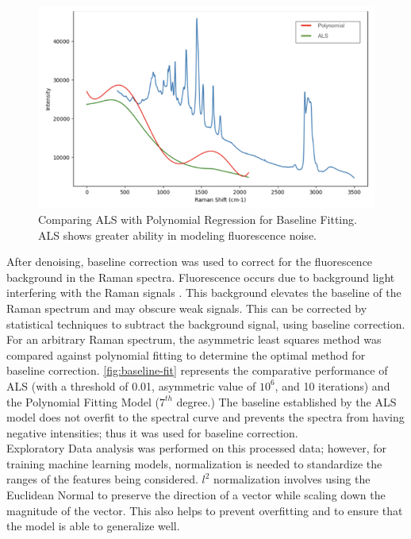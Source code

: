 \begin{figure}
    \centering
    \includegraphics[scale=0.8]{Figures/ALSvPoly.png}
    \caption{Comparing ALS with Polynomial Regression for Baseline Fitting. ALS shows greater ability in modeling fluorescence noise.}
    \label{fig:baseline-fit}
\end{figure}

\noindent After denoising, baseline correction was used to correct for the fluorescence background in the Raman spectra. Fluorescence occurs due to background light interfering with the Raman signals \cite{Cebeci2017_FluorescenceBackground}. This background elevates the baseline of the Raman spectrum and may obscure weak signals. This can be corrected by statistical techniques to subtract the background signal, using baseline correction. For an arbitrary Raman spectrum, the asymmetric least squares method was compared against polynomial fitting to determine the optimal method for baseline correction. \autoref{fig:baseline-fit} represents the comparative performance of ALS (with a threshold of 0.01, asymmetric value of $10^6$, and 10 iterations) and the Polynomial Fitting Model ($7^{th}$ degree.)  The baseline established by the ALS model does not overfit to the spectral curve and prevents the spectra from having negative intensities; thus it was used for baseline correction. \\

\noindent Exploratory Data analysis was performed on this processed data; however, for training machine learning models, normalization is needed to standardize the ranges of the features being considered. $l^2$ normalization involves using the Euclidean Normal to preserve the direction of a vector while scaling down the magnitude of the vector. \cite{Celebi2010_EuclideanNormApprox} This also helps to prevent overfitting and to ensure that the model is able to generalize well. 

